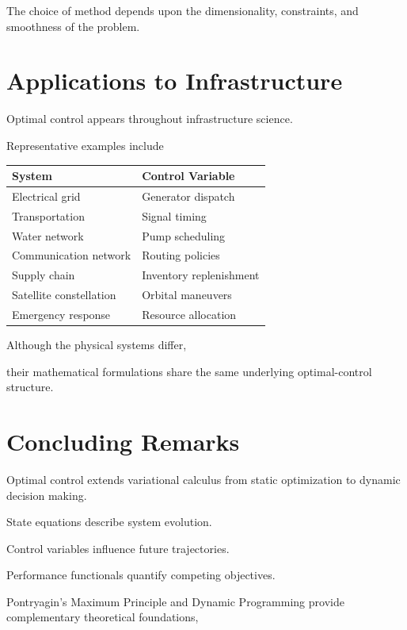 \documentclass[11pt,fleqn]{book}
\numberwithin{equation}{chapter}
\theoremstyle{plain}
\theoremstyle{definition}
\theoremstyle{remark}
\begin{document}
The choice of method depends upon the dimensionality,
constraints,
and smoothness of the problem.


\section{Applications to Infrastructure}

Optimal control appears throughout infrastructure science.

Representative examples include

\begin{center}
\begin{tabular}{ll}
\toprule
System & Control Variable\\
\midrule
Electrical grid & Generator dispatch\\
Transportation & Signal timing\\
Water network & Pump scheduling\\
Communication network & Routing policies\\
Supply chain & Inventory replenishment\\
Satellite constellation & Orbital maneuvers\\
Emergency response & Resource allocation\\
\bottomrule
\end{tabular}
\end{center}

Although the physical systems differ,

their mathematical formulations share the same underlying optimal-control
structure.


\section{Concluding Remarks}

Optimal control extends variational calculus from static optimization to
dynamic decision making.

State equations describe system evolution.

Control variables influence future trajectories.

Performance functionals quantify competing objectives.

Pontryagin's Maximum Principle and Dynamic Programming provide
complementary theoretical foundations,
\end{document}
